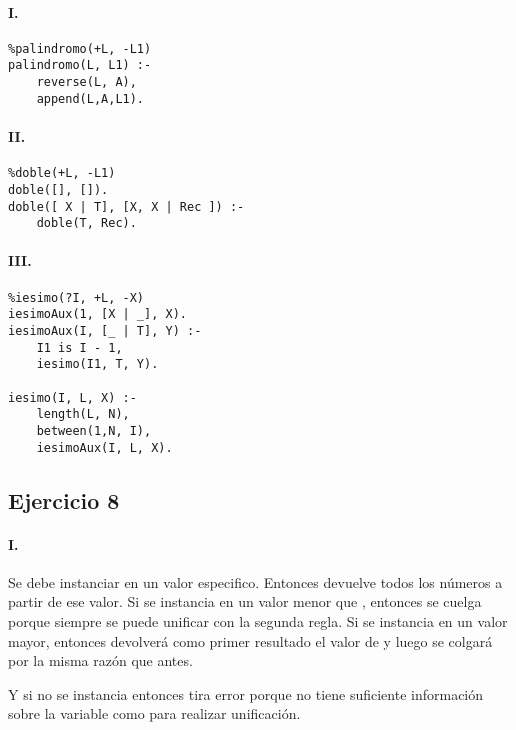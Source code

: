\documentclass[10pt,a4paper]{article}
\begin{document}
\paragraph{I.}
\begin{centrado}
\begin{verbatim}
%palindromo(+L, -L1)
palindromo(L, L1) :-
	reverse(L, A),
	append(L,A,L1).
\end{verbatim}
\end{centrado}

\paragraph{II.}
\begin{centrado}
\begin{verbatim}
%doble(+L, -L1)
doble([], []).
doble([ X | T], [X, X | Rec ]) :-
	doble(T, Rec).
\end{verbatim}
\end{centrado}

\paragraph{III.}
\begin{centrado}
\begin{verbatim}
%iesimo(?I, +L, -X)
iesimoAux(1, [X | _], X).
iesimoAux(I, [_ | T], Y) :-
	I1 is I - 1,
	iesimo(I1, T, Y).

iesimo(I, L, X) :- 
	length(L, N),
	between(1,N, I),
	iesimoAux(I, L, X).
\end{verbatim}
\end{centrado}

\subsection{Ejercicio 8}
\paragraph{I.} Se debe instanciar  en un valor especifico. Entonces devuelve todos los números a partir de ese valor. Si se instancia  en un valor menor que , entonces se cuelga porque siempre se puede unificar con la segunda regla. Si se instancia  en un valor mayor, entonces devolverá como primer resultado el valor de  y luego se colgará por la misma razón que antes.

Y si no se instancia  entonces tira error porque no tiene suficiente información sobre la variable como para realizar unificación.
\end{document}
